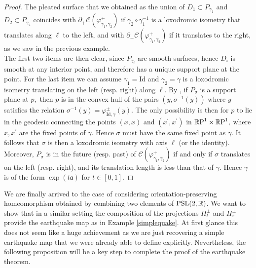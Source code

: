  \begin{proof}
     The pleated surface that we obtained as the union of $D_1\subset P_{\gamma_1}$ and $D_2\subset P_{\gamma_2}$ coincides with $\partial_+\mathcal{C}(\varphi_{\gamma_1,\gamma_2}^+)$ if $\gamma_2\circ\gamma_1^{-1}$ is a loxodromic isometry that translates along $\ell$ to the left, and with $\partial_-\mathcal{C}(\varphi_{\gamma_1,\gamma_2}^+)$ if it translates to the right, as we saw in the previous example. \\
    The first two items are then clear, since $P_{\gamma_i}$ are smooth surfaces, hence $D_i$ is smooth at any interior point, and therefore has a unique support plane at the point. For the last item we can assume $\gamma_1=\text{Id}$ and $\gamma_2=\gamma$ is a loxodromic isometry translating on the left (resp. right) along $\ell.$ By , if $P_\sigma$ is a support plane at $p,$ then $p$ is in the convex hull of the pairs $(y,\sigma^{-1}(y))$ where $y$ satisfies the relation $\sigma^{-1}(y)=\varphi_{\text{Id},\gamma}^{\pm}(y).$ The only possibility is then for $p$ to lie in the geodesic connecting the points $(x,x)$ and $(x^{\prime},x^{\prime})$ in $\mathbb{R}\text{P}^1\times\mathbb{R}\text{P}^1,$ where $x,x^{\prime}$ are the fixed points of $\gamma$. Hence $\sigma$ must have the same fixed point as $\gamma$. It follows that $\sigma$ is then a loxodromic isometry with axis $\ell$ (or the identity). Moreover, $P_\sigma$ is in the future (resp. past) of $\mathcal{C}(\varphi_{\gamma_1,\gamma_2}^+)$ if and only if $\sigma$ translates on the left (resp. right), and its translation length is less than that of $\gamma.$ Hence $\gamma$ is of the form $\exp(t\mathfrak{a})$ for $t\in [0,1].$
\end{proof}


 We are finally arrived to the case of considering orientation-preserving homeomorphism obtained by combining two elements of $\text{PSL}(2,\mathbb{R})$. We want to show that in a similar setting the composition of the projections $\Pi_l^{\pm}$ and $\Pi_r^\pm$ provide the earthquake map as in Example \ref{simplequake}. At first glance this does not seem like a huge achievement as we are just recovering a simple earthquake map that we were already able to define explicitly. Nevertheless, the following proposition will be a key step to complete the proof of the earthquake theorem. 

